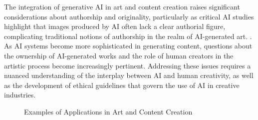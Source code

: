 The integration of generative AI in art and content creation raises significant considerations about authorship and originality, particularly as critical AI studies highlight that images produced by AI often lack a clear authorial figure, complicating traditional notions of authorship in the realm of AI-generated art. \cite{palmini2024patternscreativityuserinput}. As AI systems become more sophisticated in generating content, questions about the ownership of AI-generated works and the role of human creators in the artistic process become increasingly pertinent. Addressing these issues requires a nuanced understanding of the interplay between AI and human creativity, as well as the development of ethical guidelines that govern the use of AI in creative industries.








{
\begin{figure}[ht!]
\centering
{}\hspace{0.03\textwidth}
\hspace{0.03\textwidth}
\hspace{0.03\textwidth}
\caption{Examples of Applications in Art and Content Creation}\label{fig:retrieve_fig_2}
\end{figure}
}



